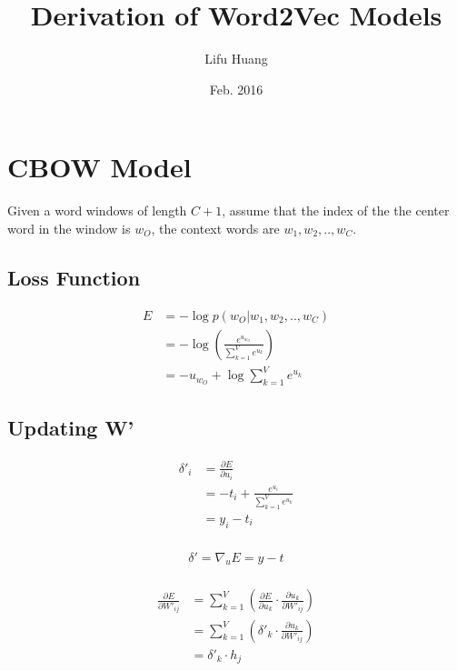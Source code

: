 \documentclass{article}
\title{Derivation of Word2Vec Models}
\author{Lifu Huang}
\date{Feb. 2016}
\begin{document}
	\maketitle
	\section{CBOW Model}
	Given a word windows of length $C+1$, assume that the index of the the center word in the window is $w_O$, the context words are $w_1, w_2, .., w_C$.
	\subsection{Loss Function}
	\begin{equation}
		\begin{aligned}
			E &=-\log  p(w_{O}|w_{1}, w_{2}, .., w_{C})\\ 
			&=-\log  \left( \frac { e^{ u_{w_{O}} } }{ \sum _{ k=1 }^{ V } e^{ u_{ k } } }  \right) \\ 
			&=-u_{w_{O}}+\log { \sum _{ k=1 }^{ V } e^{ u_{ k } } } 
		\end{aligned}
	\end{equation}
	\subsection{Updating W'}
	\begin{equation}
		\begin{aligned}
			\delta'_i &= \frac{\partial E}{\partial u_{i}} \\
			&= -t_i + \frac{e^{u_i}}{\sum_{k=1}^{V}e^{u_{k}}} \\
			&= y_i - t_i \\
		\end{aligned}
	\end{equation}

	\begin{equation}
		\begin{aligned}
			\delta' = \nabla_u E = y - t \\		
		\end{aligned}
	\end{equation}
	
	\begin{equation}
		\begin{aligned}
			\frac{\partial E}{\partial W'_{ij}} &= \sum_{k=1}^{V} \left( \frac{\partial E}{\partial u_k} \cdot \frac{\partial u_k}{\partial W'_{ij}} \right) \\
			&= \sum_{k=1}^{V} \left(\delta'_k \cdot \frac{\partial u_k}{\partial W'_{ij}}\right)  \\
			&= \delta'_k \cdot h_j \\
		\end{aligned}
	\end{equation}	
\end{document}
